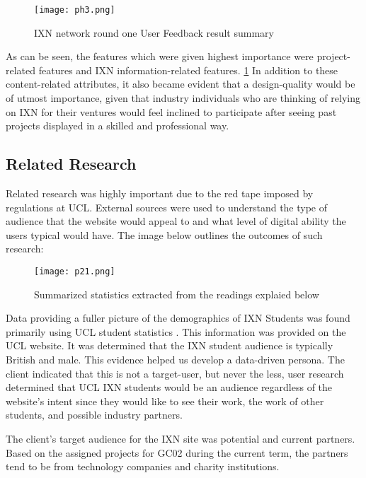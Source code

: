 \begin{figure}[H]
      \centering
      \texttt{[image: ph3.png]}
      \caption{IXN network round one User Feedback result summary}
\label{userfeedback}
 \end{figure}

As can be seen, the features which were given highest importance were
project-related features and IXN information-related features.
\ref{userfeedback} In addition to these content-related attributes, it
also became evident that a design-quality would be of utmost importance,
given that industry individuals who are thinking of relying on IXN for
their ventures would feel inclined to participate after seeing past
projects displayed in a skilled and professional way.

\hypertarget{related-research}{%
\subsection{Related Research}\label{related-research}}

Related research was highly important due to the red tape imposed by
regulations at UCL. External sources were used to understand the type of
audience that the website would appeal to and what level of digital
ability the users typical would have. The image below outlines the
outcomes of such research:

\begin{figure}[H]
      \centering
      \texttt{[image: p21.png]}
      \caption{Summarized statistics extracted from the readings explaied below}
 \end{figure}

Data providing a fuller picture of the demographics of IXN Students was
found primarily using UCL student statistics \cite{ps1}. This
information was provided on the UCL website. It was determined that the
IXN student audience is typically British and male. This evidence helped
us develop a data-driven persona. The client indicated that this is not
a target-user, but never the less, user research determined that UCL IXN
students would be an audience regardless of the website's intent since
they would like to see their work, the work of other students, and
possible industry partners.

The client's target audience for the IXN site was potential and current
partners. Based on the assigned projects for GC02 during the current
term, the partners tend to be from technology companies and charity
institutions.

